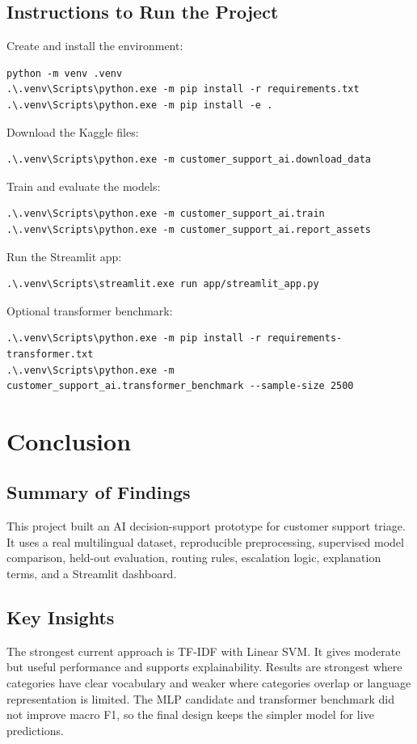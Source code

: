 \documentclass[11pt,a4paper]{article}
\begin{document}
\subsection{Instructions to Run the Project}
Create and install the environment:
\begin{verbatim}
python -m venv .venv
.\.venv\Scripts\python.exe -m pip install -r requirements.txt
.\.venv\Scripts\python.exe -m pip install -e .
\end{verbatim}

Download the Kaggle files:
\begin{verbatim}
.\.venv\Scripts\python.exe -m customer_support_ai.download_data
\end{verbatim}

Train and evaluate the models:
\begin{verbatim}
.\.venv\Scripts\python.exe -m customer_support_ai.train
.\.venv\Scripts\python.exe -m customer_support_ai.report_assets
\end{verbatim}

Run the Streamlit app:
\begin{verbatim}
.\.venv\Scripts\streamlit.exe run app/streamlit_app.py
\end{verbatim}

Optional transformer benchmark:
\begin{verbatim}
.\.venv\Scripts\python.exe -m pip install -r requirements-transformer.txt
.\.venv\Scripts\python.exe -m customer_support_ai.transformer_benchmark --sample-size 2500
\end{verbatim}

\section{Conclusion}
\subsection{Summary of Findings}
This project built an AI decision-support prototype for customer support triage. It uses a real multilingual dataset, reproducible preprocessing, supervised model comparison, held-out evaluation, routing rules, escalation logic, explanation terms, and a Streamlit dashboard.

\subsection{Key Insights}
The strongest current approach is TF-IDF with Linear SVM. It gives moderate but useful performance and supports explainability. Results are strongest where categories have clear vocabulary and weaker where categories overlap or language representation is limited. The MLP candidate and transformer benchmark did not improve macro F1, so the final design keeps the simpler model for live predictions.
\end{document}
